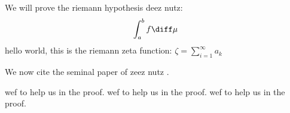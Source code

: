 \documentclass{article}
\begin{document}
We will prove the riemann hypothesis deez nutz:
\begin{equation}
    \displaystyle\int_{a}^{b}f \diff \mu  
\end{equation}
hello world, this is the riemann zeta function:
$ \zeta = \displaystyle\sum^{\infty}_{i=1}a_k $

We now cite the seminal paper of zeez nutz \cite{kallenberg1997foundations}.

wef \cite{hammond2021brownian} to help us in the proof.
wef \cite{schilling2021brownian} to help us in the proof.
wef \cite{hammond2019patchwork} to help us in the proof.



\end{document}
